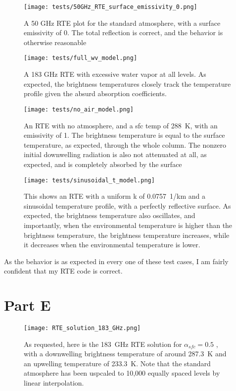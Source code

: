 \documentclass{article}
\begin{document}
\begin{figure}[H]
    \texttt{[image: tests/50GHz\_RTE\_surface\_emissivity\_0.png]}
    \caption{A 50 GHz RTE plot for the standard atmosphere, with a surface emissivity of 0. The total reflection is correct, and the behavior is otherwise reasonable}
\end{figure}

\begin{figure}[H]
    \texttt{[image: tests/full\_wv\_model.png]}
    \caption{A 183 GHz RTE with excessive water vapor at all levels. As expected, the brightness temperatures closely track the temperature profile given the absurd absorption coefficients.}
\end{figure}

\begin{figure}[H]
    \texttt{[image: tests/no\_air\_model.png]}
    \caption{An RTE with no atmosphere, and a sfc temp of \qty{288}{K}, with an emissivity of 1. The brightness temperature is equal to the surface temperature, as expected, through the whole column. The nonzero initial downwelling radiation is also not attenuated at all, as expected, and is completely absorbed by the surface}
\end{figure}

\begin{figure}[H]
    \texttt{[image: tests/sinusoidal\_t\_model.png]}
    \caption{This shows an RTE with a uniform k of \qty{0.0757}{1/km} and a sinusoidal temperature profile, with a perfectly reflective surface. As expected, the brightness temperature also oscillates, and importantly, when the environmental temperature is higher than the brightness temperature, the brightness temperature increases, while it decreases when the environmental temperature is lower.}
\end{figure}

As the behavior is as expected in every one of these test cases, I am fairly confident that my RTE code is correct.

\section*{Part E}

\begin{figure}[H]
    \texttt{[image: RTE\_solution\_183\_GHz.png]}
    \caption{As requested, here is the \qty{183}{GHz} RTE solution for $\alpha_{sfc} = 0.5$ , with a downwelling brightness temperature of around \qty{287.3}{K} and an upwelling temperature of \qty{233.3}{K}. Note that the standard atmosphere has been uspcaled to 10,000 equally spaced levels by linear interpolation.}
\end{figure}
\end{document}
